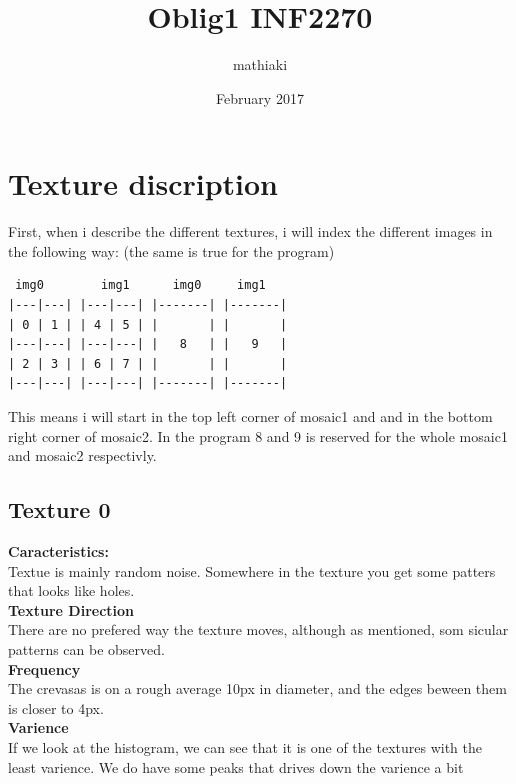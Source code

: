 \documentclass{article}
\title{Oblig1 INF2270}
\author{mathiaki}
\date{February 2017}
\begin{document}
\maketitle

\newpage
\tableofcontents
\newpage

\section{Texture discription}
First, when i describe the different textures, i will index the different images in the following way: (the same is true for the program)\\
\begin{verbatim}
 img0        img1      img0     img1
|---|---| |---|---| |-------| |-------|
| 0 | 1 | | 4 | 5 | |       | |       |
|---|---| |---|---| |   8   | |   9   |
| 2 | 3 | | 6 | 7 | |       | |       |
|---|---| |---|---| |-------| |-------|

\end{verbatim}

This means i will start in the top left corner of mosaic1 and and in the bottom right corner of mosaic2. In the program 8 and 9 is reserved for the whole mosaic1 and mosaic2 respectivly. 

\newpage

\subsection{Texture 0}
\textbf{Caracteristics:}\\
Textue is mainly random noise. Somewhere in the texture you get some patters that looks like holes. \\

\textbf{Texture Direction}\\
There are no prefered way the texture moves, although as mentioned, som sicular patterns can be observed.\\

\textbf{Frequency} \\
The crevasas is on a rough average 10px in diameter, and the edges beween them is closer to 4px.\\ 


\textbf{Varience}\\
If we look at the histogram, we can see that it is one of the textures with the least varience. We do have some peaks that drives down the varience a bit\\
\end{document}
